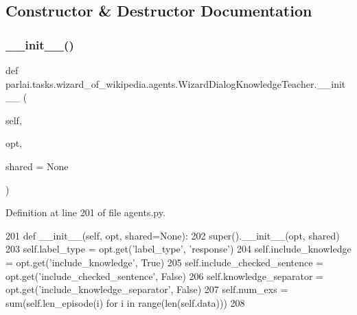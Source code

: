 \subsection{Constructor \& Destructor Documentation}
\mbox{\label{classparlai_1_1tasks_1_1wizard__of__wikipedia_1_1agents_1_1WizardDialogKnowledgeTeacher_a075ea712e50610abf78b8d976e0a460c}} 
\subsubsection{\texorpdfstring{\+\_\+\+\_\+init\+\_\+\+\_\+()}{\_\_init\_\_()}}
{\footnotesize\ttfamily def parlai.\+tasks.\+wizard\+\_\+of\+\_\+wikipedia.\+agents.\+Wizard\+Dialog\+Knowledge\+Teacher.\+\_\+\+\_\+init\+\_\+\+\_\+ (\begin{DoxyParamCaption}\item[{}]{self,  }\item[{}]{opt,  }\item[{}]{shared = {\ttfamily None} }\end{DoxyParamCaption})}



Definition at line 201 of file agents.\+py.


\begin{DoxyCode}
201     \textcolor{keyword}{def }\_\_init\_\_(self, opt, shared=None):
202         super().\_\_init\_\_(opt, shared)
203         self.label\_type = opt.get(\textcolor{stringliteral}{'label\_type'}, \textcolor{stringliteral}{'response'})
204         self.include\_knowledge = opt.get(\textcolor{stringliteral}{'include\_knowledge'}, \textcolor{keyword}{True})
205         self.include\_checked\_sentence = opt.get(\textcolor{stringliteral}{'include\_checked\_sentence'}, \textcolor{keyword}{False})
206         self.knowledge\_separator = opt.get(\textcolor{stringliteral}{'include\_knowledge\_separator'}, \textcolor{keyword}{False})
207         self.num\_exs = sum(self.len\_episode(i) \textcolor{keywordflow}{for} i \textcolor{keywordflow}{in} range(len(self.data)))
208 
\end{DoxyCode}


